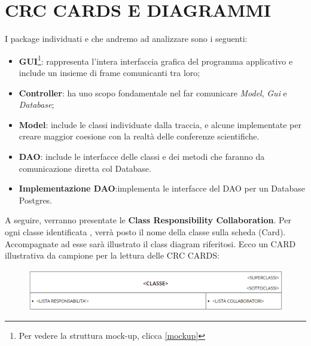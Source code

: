 \documentclass[a4paper,italian,10pt,openany]{book}
\begin{document}
	\chapter{CRC CARDS E DIAGRAMMI}
	I package individuati e che andremo ad analizzare sono i seguenti:
	\begin{itemize}
	\item \textbf{GUI}\footnote{Per vedere la struttura mock-up, clicca \underline{\ref{mockup}}}: rappresenta l'intera interfaccia grafica del programma applicativo e include un insieme di frame comunicanti tra loro;
	\item \textbf{Controller}: ha uno scopo fondamentale nel far comunicare \textit{Model}, \textit{Gui} e \textit{Database};
	\item \textbf{Model}: include le classi individuate dalla traccia, e alcune implementate per creare maggior coesione con la realtà delle conferenze scientifiche.
	\item \textbf{DAO}: include le interfacce delle classi e dei metodi che faranno da comunicazione diretta col Database.
	\item \textbf{Implementazione DAO}:implementa le interfacce del DAO per un Database Postgres.
 \end{itemize}
	A seguire, verranno presentate le \textbf{Class Responsibility Collaboration}. Per ogni classe identificata , verrà posto il nome della classe sulla scheda (Card). Accompagnate ad esse sarà illustrato il class diagram riferitosi. Ecco un CARD illustrativa da campione per la lettura delle CRC CARDS:
	\begin{figure}[h!]
	\centering
	\includegraphics[width=16cm]{crc_cardsEx}
	\end{figure}
	\newpage
\end{document}
